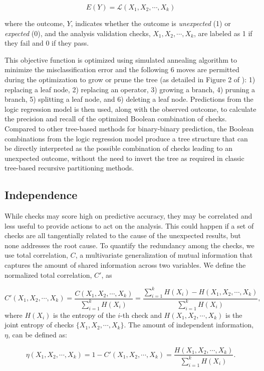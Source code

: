 \documentclass[
  12pt,
]{interact}
\begin{document}
\[E(Y) = \mathcal{L}(X_1, X_2, \cdots, X_k)\]

where the outcome, \(Y\), indicates whether the outcome is
\emph{unexpected} (1) or \emph{expected} (0), and the analysis
validation checks, \(X_1, X_2, \cdots, X_k\), are labeled as 1 if they
fail and 0 if they pass.

This objective function is optimized using simulated annealing algorithm
to minimize the misclassification error and the following 6 moves are
permitted during the optimization to grow or prune the tree (as detailed
in Figure 2 of \citet{ruczinski_logic_2003}): 1) replacing a leaf node,
2) replacing an operator, 3) growing a branch, 4) pruning a branch, 5)
splitting a leaf node, and 6) deleting a leaf node. Predictions from the
logic regression model is then used, along with the observed outcome, to
calculate the precision and recall of the optimized Boolean combination
of checks. Compared to other tree-based methods for binary-binary
prediction, the Boolean combinations from the logic regression model
produce a tree structure that can be directly interpreted as the
possible combination of checks leading to an unexpected outcome, without
the need to invert the tree as required in classic tree-based recursive
partitioning methods.

\subsection{Independence}\label{independence}

While checks may score high on predictive accuracy, they may be
correlated and less useful to provide actions to act on the analysis.
This could happen if a set of checks are all tangentially related to the
cause of the unexpected results, but none addresses the root cause. To
quantify the redundancy among the checks, we use total correlation,
\(C\), a multivariate generalization of mutual information that captures
the amount of shared information across two variables. We define the
normalized total correlation, \(C'\), as

\[C'(X_1, X_2, \cdots, X_k) = \frac{C(X_1, X_2, \cdots, X_k)}{\sum_{i= 1}^k H(X_i)} = \frac{\sum_{i= 1}^k H(X_i) - H(X_1, X_2, \cdots, X_k)}{\sum_{i= 1}^k H(X_i)}, \]
where \(H(X_i)\) is the entropy of the \(i\)-th check and
\(H(X_1, X_2, \cdots, X_k)\) is the joint entropy of checks
\(\{X_1, X_2, \cdots, X_k\}\). The amount of independent information,
\(\eta\), can be defined as:

\[\eta(X_1, X_2, \cdots, X_k) = 1 - C'(X_1, X_2, \cdots, X_k) = \frac{H(X_1, X_2, \cdots, X_k)}{\sum_{i= 1}^k H(X_i)}.\]
\end{document}
